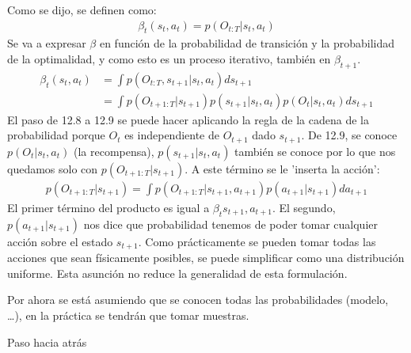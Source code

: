 Como se dijo, se definen como:
\begin{align}
\beta _ { t } ( s _ { t } , a _ { t } ) = p ( O _ { t : T } | s _ { t } , a _ { t } )
\end{align}
Se va a expresar $\beta$ en función de la probabilidad de transición y la probabilidad de la
optimalidad, y como esto es un proceso iterativo, también en $\beta_{t+1}$.
\begin{align}
    \beta_t(s_t,a_t)&=\int p ( O _ { t : T } , s _ { t + 1 } | s _ { t } , a _ { t } ) d s _ { t
    + 1 }\\
    & = \int p ( O _ { t + 1 : T } | s _ { t + 1 } ) p ( s _ { t + 1 } | s _ { t } , a _ { t } ) p ( O _ { t } | s _ { t } , a _ { t } ) d s _ { t + 1 }
\end{align}
El paso de 12.8 a 12.9 se puede hacer aplicando la regla de la cadena de la probabilidad porque $O_t$ es independiente de $O_{t+1}$ dado $s_{t+1}$.
De 12.9, se conoce $p(O_t|s_t,a_t)$ (la recompensa), $p(s_{t+1}|s_t,a_t)$ también se conoce
por lo que nos quedamos solo con $p(O_{t+1:T}|s_{t+1})$. A este término se le 'inserta la
acción':
\begin{align}
p ( O _ { t + 1 : T } | s _ { t + 1 } ) = \int p ( O _ { t + 1 : T } | s _ { t + 1 } , a _ { t + 1 } ) p ( a _ { t + 1 } | s _ { t + 1 } ) d a _ { t + 1 }
\end{align}
El primer término del producto es igual a $\beta_t{s_{t+1},a_{t+1}}$. El segundo,
$p(a_{t+1}|s_{t+1})$ nos dice que probabilidad tenemos de poder tomar cualquier acción
sobre el estado $s_{t+1}$. Como prácticamente se pueden tomar todas las acciones que sean
físicamente posibles, se puede simplificar como una distribución uniforme. Esta asunción no
reduce la generalidad de esta formulación.

Por ahora se está asumiendo que se conocen todas las probabilidades (modelo, \ldots), en la
práctica se tendrán que tomar muestras.

\begin{algorithm}
    \caption{Paso hacia atrás}
\end{algorithm}

